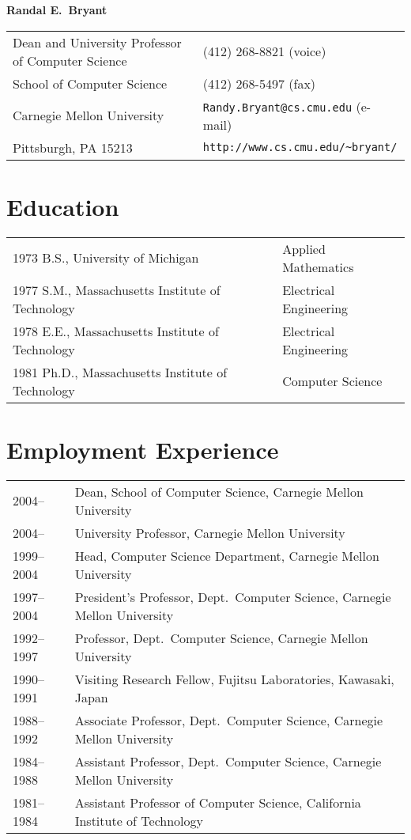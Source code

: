 \documentclass{article}
\begin{document}
\begin{center}
{\large\bf Randal E.~Bryant}
\end{center}

\begin{flushleft}
\begin{tabular}{p{3.75in}l}
Dean and University Professor of Computer Science      & (412) 268-8821 (voice)\\
School of Computer Science & (412) 268-5497 (fax)\\
Carnegie Mellon University            & {\tt Randy.Bryant@cs.cmu.edu} (e-mail)\\
Pittsburgh, PA 15213     & \verb+http://www.cs.cmu.edu/~bryant/+\\
\end{tabular}
\end{flushleft}

\section*{Education}

\begin{tabular}{ll}
1973 B.S., University of Michigan & Applied Mathematics\\
1977 S.M., Massachusetts Institute of Technology & Electrical Engineering\\
1978 E.E., Massachusetts Institute of Technology & Electrical Engineering\\
1981 Ph.D., Massachusetts Institute of Technology & Computer Science\\
\end{tabular}

\section*{Employment Experience}

\begin{tabular}{ll}
2004-- & Dean, School of Computer Science, Carnegie Mellon University\\
2004-- & University Professor, Carnegie Mellon University\\
1999--2004 & Head, Computer Science Department, Carnegie Mellon University\\
1997--2004 & President's Professor, Dept.\ Computer Science, Carnegie Mellon University \\
1992--1997 & Professor, Dept.\ Computer Science, Carnegie Mellon University \\
1990--1991 & Visiting Research Fellow, Fujitsu Laboratories, Kawasaki, Japan \\
1988--1992 & Associate Professor, Dept.\ Computer Science, Carnegie Mellon University \\
1984--1988 & Assistant Professor, Dept.\ Computer Science, Carnegie Mellon University \\
1981--1984 & Assistant Professor of Computer Science, California Institute of Technology\\
\end{tabular}
\end{document}
